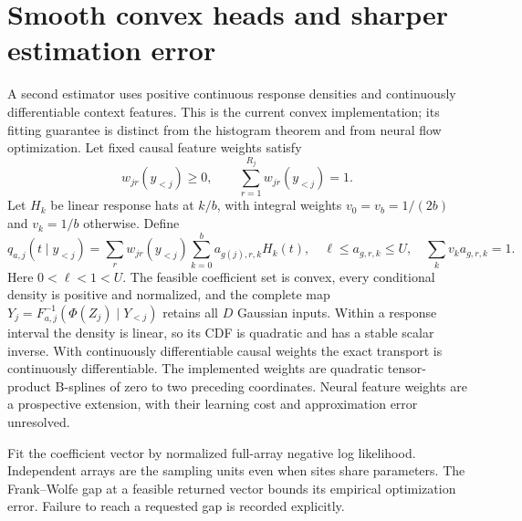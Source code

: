 \documentclass[11pt]{article}
\begin{document}
\section{Smooth convex heads and sharper estimation error}
A second estimator uses positive continuous response densities and continuously differentiable context features. This is the current convex implementation; its fitting guarantee is distinct from the histogram theorem and from neural flow optimization. Let fixed causal feature weights satisfy
\begin{equation}
 w_{jr}(y_{<j})\ge0,\qquad \sum_{r=1}^{R_j}w_{jr}(y_{<j})=1.
\end{equation}
Let $H_k$ be linear response hats at $k/b$, with integral weights $v_0=v_b=1/(2b)$ and $v_k=1/b$ otherwise. Define
\begin{equation}
 q_{a,j}(t\mid y_{<j})=\sum_r w_{jr}(y_{<j})\sum_{k=0}^b a_{g(j),r,k}H_k(t),
 \quad \ell\le a_{g,r,k}\le U,\quad \sum_k v_k a_{g,r,k}=1.
\end{equation}
Here $0<\ell<1<U$. The feasible coefficient set is convex, every conditional density is positive and normalized, and the complete map $Y_j=F_{a,j}^{-1}(\Phi(Z_j)\mid Y_{<j})$ retains all $D$ Gaussian inputs. Within a response interval the density is linear, so its CDF is quadratic and has a stable scalar inverse. With continuously differentiable causal weights the exact transport is continuously differentiable. The implemented weights are quadratic tensor-product B-splines of zero to two preceding coordinates. Neural feature weights are a prospective extension, with their learning cost and approximation error unresolved.

Fit the coefficient vector by normalized full-array negative log likelihood. Independent arrays are the sampling units even when sites share parameters. The Frank--Wolfe gap at a feasible returned vector bounds its empirical optimization error. Failure to reach a requested gap is recorded explicitly.
\end{document}
